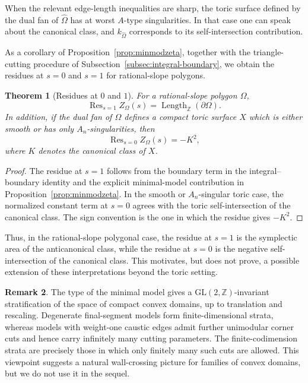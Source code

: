 \documentclass[a4paper,american,11pt]{amsart}
\theoremstyle{plain}
\newtheorem{theorem}{Theorem}[section]
\theoremstyle{definition}
\newtheorem{remark}[theorem]{Remark}
\newcommand{\Z}{\mathbb Z}
\DeclareMathOperator*{\Res}{Res}
\DeclareMathOperator{\Length}{Length}
\begin{document}
When the relevant edge-length inequalities are sharp, the toric surface
defined by the dual fan of \(\widehat\Omega\) has at worst \(A\)-type
singularities. In that case one can speak about the canonical class, and
\(k_{\widehat\Omega}\) corresponds to its self-intersection contribution.

As a corollary of Proposition~\ref{prop:minmodzeta}, together with the
triangle-cutting procedure of Subsection~\ref{subsec:integral-boundary}, we
obtain the residues at \(s=0\) and \(s=1\) for rational-slope polygons.

\begin{theorem}[Residues at \(0\) and \(1\)]\label{thm:res0and1}
For a rational-slope polygon \(\Omega\),
\[
\Res_{s=1} Z_\Omega(s)=\Length_{\Z}(\partial\Omega).
\]
In addition, if the dual fan of \(\Omega\) defines a compact toric surface
\(X\) which is either smooth or has only \(A_n\)-singularities, then
\[
\Res_{s=0} Z_\Omega(s)=-K^2,
\]
where \(K\) denotes the canonical class of \(X\).
\end{theorem}

\begin{proof}
The residue at \(s=1\) follows from the boundary term in the
integral--boundary identity and the explicit minimal-model contribution in
Proposition~\ref{prop:minmodzeta}. In the smooth or \(A_n\)-singular toric
case, the normalized constant term at \(s=0\) agrees with the toric
self-intersection of the canonical class. The sign convention is the one in
which the residue gives \(-K^2\).
\end{proof}

Thus, in the rational-slope polygonal case, the residue at \(s=1\) is the
symplectic area of the anticanonical class, while the residue at \(s=0\) is
the negative self-intersection of the canonical class. This motivates, but
does not prove, a possible extension of these interpretations beyond the
toric setting.

\begin{remark}
The type of the minimal model gives a \(\mathrm{GL}(2,\Z)\)-invariant
stratification of the space of compact convex domains, up to translation and
rescaling. Degenerate final-segment models form finite-dimensional strata,
whereas models with weight-one caustic edges admit further unimodular corner
cuts and hence carry infinitely many cutting parameters. The finite-codimension
strata are precisely those in which only finitely many such cuts are allowed.
This viewpoint suggests a natural wall-crossing picture for families of
convex domains, but we do not use it in the sequel.
\end{remark}
\end{document}
